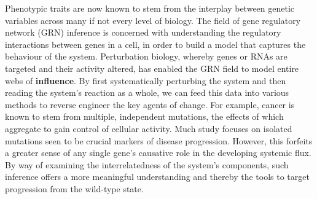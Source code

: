 
\begin{abstracts}

Phenotypic traits are now known to stem from the interplay between genetic variables across many if not every level of biology. The field of gene regulatory network (GRN) inference is concerned with understanding the regulatory interactions between genes in a cell, in order to build a model that captures the behaviour of the system. Perturbation biology, whereby genes or RNAs are targeted and their activity altered, has enabled the GRN field to model entire webs of \textbf{influence}. By first systematically perturbing the system and then reading the system's reaction as a whole, we can feed this data into various methods to reverse engineer the key agents of change. For example, cancer is known to stem from multiple, independent mutations, the effects of which aggregate to gain control of cellular activity. Much study focuses on isolated mutations seen to be crucial markers of disease progression. However, this forfeits a greater sense of any single gene's causative role in the developing systemic flux. By way of examining the interrelatedness of the system's components, such inference offers a more meaningful understanding and thereby the tools to target progression from the wild-type state.




\end{abstracts}

